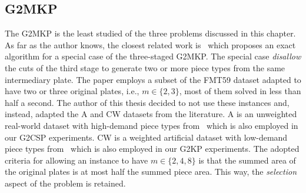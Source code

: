 \subsection{G2MKP}

The G2MKP is the least studied of the three problems discussed in this chapter.
As far as the author knows, the closest related work is~\citet{cui:2008} which proposes an exact algorithm for a special case of the three-staged G2MKP.
The special case \emph{disallow} the cuts of the third stage to generate two or more piece types from the same intermediary plate.
The paper employs a subset of the FMT59 dataset adapted to have two or three original plates, i.e., \(m \in \{2, 3\}\), most of them solved in less than half a second.
The author of this thesis decided to not use these instances and, instead, adapted the A and CW datasets from the literature.
A is an unweighted real-world dataset with high-demand piece types from~\citet{macedo:2010} which is also employed in our G2CSP experiments.
CW is a weighted artificial dataset with low-demand piece types from~\citet{fayard:1998} which is also employed in our G2KP experiments.
The adopted criteria for allowing an instance to have \(m \in \{2, 4, 8\}\) is that the summed area of the original plates is at most half the summed piece area.
This way, the \emph{selection} aspect of the problem is retained.

